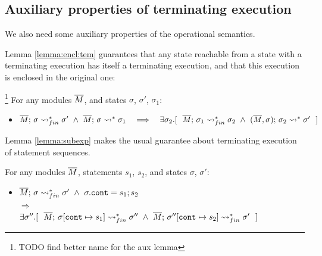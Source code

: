 \subsection{Auxiliary properties of terminating execution} 
\label{sect:termExecs}
We also need some auxiliary properties of the operational semantics.
 
Lemma \ref{lemma:encl:tem} guarantees that any state reachable from a state with a terminating execution has itself a terminating execution, and that this execution is enclosed in the original one:
 
 \begin{auxLemma}\footnote{TODO find better name for the aux lemma}
 \label{lemma:encl:tem}
 For any modules $\overline{M}$,   and states $\sigma$, $\sigma'$, $\sigma_1$:
\begin{itemize}
\item
$  \leadstoBoundedStarFin {\Mtwo}  {\sigma}  {\sigma'} \  \wedge \  \leadstoBoundedStar  {\Mtwo}  {\sigma}  {\sigma_1} 
\ \ \  \Longrightarrow\ \ \  %
 \exists \sigma_2.[\ \ \leadstoBoundedStarFin {\Mtwo} {\sigma_1}  {\sigma_2}  
\ \wedge\ 
\leadstoBoundedStarThree  {\Mtwo}  {\sigma_2}  {\sigma}   {\sigma'} \ \ ]$
\end{itemize}

\end{auxLemma} 
 
Lemma \ref{lemma:subexp} makes the usual guarantee about terminating execution of statement sequences.
  
\begin{auxLemma}
\label{lemma:subexp}
For any modules $\overline{M}$, statements $s_1$, $s_2$, and states $\sigma$, $\sigma'$:
\begin{itemize}
\item
$  \overline{M};\, {\sigma} \rightsquigarrow^*_{fin} \sigma' \   \wedge\  \sigma.\texttt{cont} = s_1; s_2$\\
$  \Longrightarrow$\\
$   \exists \sigma''.[\ \ \leadstoBoundedStarFin {\Mtwo} {\sigma[\texttt{cont}\mapsto s_1]}  {\sigma''}  
\ \wedge\ 
\leadstoBoundedStarFin {\Mtwo} {\sigma''[\texttt{cont}\mapsto s_2]}   {\sigma'} \ \ ]$
\end{itemize}
\end{auxLemma}
 

